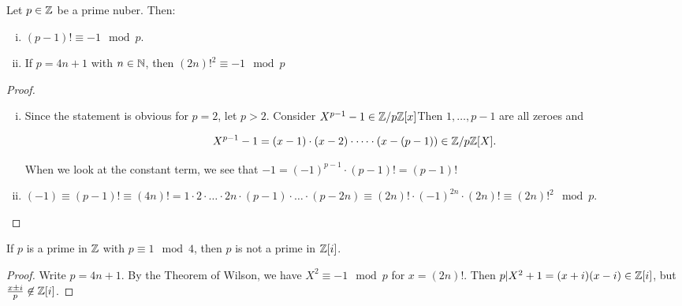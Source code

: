 \begin{Prop}
	Let $p \in \mathbb{Z}$ be a prime nuber. Then:
	\begin{enumerate}[(i)]
		\item $(p-1)! \equiv -1 \mod p$.
		
		\item If  $p = 4n+1$ with $n \in \mathbb{N}$, then $(2n)!^2 \equiv -1 \mod p$ 
	\end{enumerate}
\end{Prop}
\begin{proof}
	\begin{enumerate}[(i)]
		\item 	Since the statement is obvious for $p=2$, let $p > 2$. Consider $X^{p-1} - 1 \in \mathbb{Z} /p\mathbb{Z}[x]$Then $1, \dots, p-1$ are all zeroes and 
		
		\[	X^{p-1} - 1 = (x-1)\cdot (x-2) \cdot \dots \cdot (x-(p-1)) \in \mathbb{Z}/p\mathbb{Z}[X].	\]
		
		When we look at the constant term, we see that $-1 = (-1)^{p-1} \cdot (p-1)! = (p-1)!$
		
		\item $(-1) \equiv (p-1)! \equiv (4n)! = 1 \cdot 2 \cdot \dots \cdot 2n \cdot (p-1) \cdot \dots \cdot (p-2n) \equiv (2n)! \cdot (-1)^{2n} \cdot (2n)! \equiv (2n)!^2 \mod p$.
	\end{enumerate}
\end{proof}

\begin{Prop}
	If $p$ is a prime in $\mathbb{Z}$ with $p \equiv 1 \mod 4$, then $p$ is not a prime in $\mathbb{Z}[i]$.
\end{Prop}
\begin{proof}
	Write $p = 4n+1$. By the Theorem of Wilson, we have $X^2 \equiv -1 \mod p$ for $x = (2n)!$. Then $p \vert X^2+1 = (x+i)(x-i) \in \mathbb{Z}[i]$, but $\frac{x \pm i}{p} \not\in \mathbb{Z}[i]$.
\end{proof}

